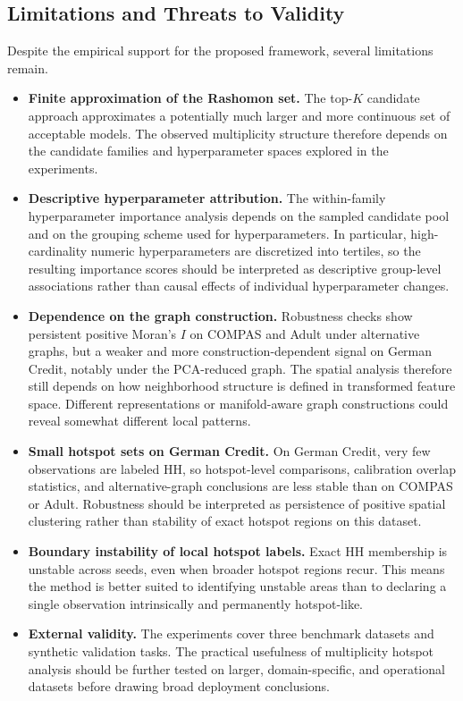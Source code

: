 \subsection{Limitations and Threats to Validity}

Despite the empirical support for the proposed framework, several limitations remain.

\begin{itemize}
    \item \textbf{Finite approximation of the Rashomon set.} The top-$K$ candidate approach 
    approximates a potentially much larger and more continuous set of acceptable models. The 
    observed multiplicity structure therefore depends on the candidate families and hyperparameter
    spaces explored in the experiments.

    \item \textbf{Descriptive hyperparameter attribution.} The within-family hyperparameter
    importance analysis depends on the sampled candidate pool and on the grouping scheme used 
    for hyperparameters. In particular, high-cardinality numeric hyperparameters are discretized
    into tertiles, so the resulting importance scores should be interpreted as descriptive 
    group-level associations rather than causal effects of individual hyperparameter changes.
    
    \item \textbf{Dependence on the graph construction.} Robustness checks show
    persistent positive Moran's $I$ on COMPAS and Adult under alternative graphs,
    but a weaker and more construction-dependent signal on German Credit, notably
    under the PCA-reduced graph. The spatial analysis therefore still depends on how
    neighborhood structure is defined in transformed feature space. Different
    representations or manifold-aware graph constructions could reveal somewhat different
    local patterns.

    \item \textbf{Small hotspot sets on German Credit.} On German Credit, very few
    observations are labeled HH, so hotspot-level comparisons, calibration overlap
    statistics, and alternative-graph conclusions are less stable than on COMPAS or
    Adult. Robustness should be interpreted as persistence of positive spatial clustering
    rather than stability of exact hotspot regions on this dataset.
    
    \item \textbf{Boundary instability of local hotspot labels.} Exact HH membership is 
    unstable across seeds, even when broader hotspot regions recur. This means the method
    is better suited to identifying unstable areas than to declaring a single observation 
    intrinsically and permanently hotspot-like.
    
    \item \textbf{External validity.} The experiments cover three benchmark datasets and 
    synthetic validation tasks. The practical usefulness of multiplicity hotspot analysis 
    should be further tested on larger, domain-specific, and operational datasets before 
    drawing broad deployment conclusions.
\end{itemize}
